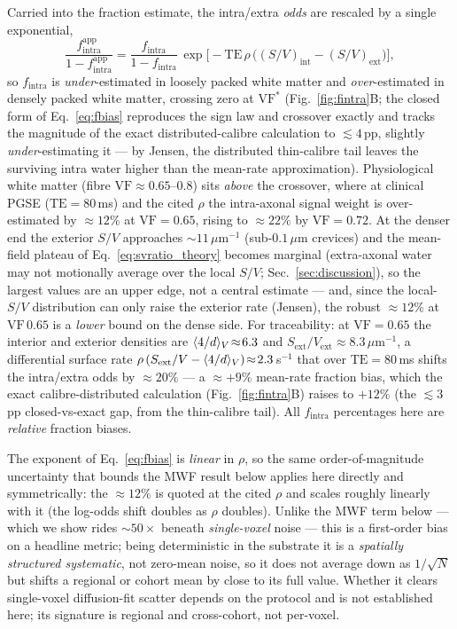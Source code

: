 Carried into the fraction estimate, the intra/extra \emph{odds} are rescaled by a single
exponential,
\begin{equation}
  \frac{f_{\mathrm{intra}}^{\mathrm{app}}}{1-f_{\mathrm{intra}}^{\mathrm{app}}}
  = \frac{f_{\mathrm{intra}}}{1-f_{\mathrm{intra}}}\,
    \exp\!\big[-\mathrm{TE}\,\rho\,\big((S/V)_{\mathrm{int}}-(S/V)_{\mathrm{ext}}\big)\big],
  \label{eq:fbias}
\end{equation}
so $f_{\mathrm{intra}}$ is \emph{under}-estimated in loosely packed white matter and
\emph{over}-estimated in densely packed white matter, crossing zero at $\mathrm{VF}^{\ast}$
(Fig.~\ref{fig:fintra}B; the closed form of Eq.~\eqref{eq:fbias} reproduces the sign law and
crossover exactly and tracks the magnitude of the exact distributed-calibre calculation to
${\lesssim}4$\,pp, slightly \emph{under}-estimating it --- by Jensen, the distributed thin-calibre
tail leaves the surviving intra water higher than the mean-rate approximation). Physiological
white matter (fibre
$\mathrm{VF}\approx0.65$--$0.8$) sits \emph{above} the crossover, where at clinical PGSE
($\mathrm{TE}=80$\,ms) and the cited $\rho$ the intra-axonal signal weight is over-estimated by
${\approx}12\%$ at $\mathrm{VF}=0.65$, rising to ${\approx}22\%$ by $\mathrm{VF}=0.72$. At the
denser end the exterior $S/V$ approaches ${\sim}11\,\mu$m$^{-1}$ (sub-$0.1\,\mu$m crevices) and
the mean-field plateau of Eq.~\eqref{eq:svratio_theory} becomes marginal (extra-axonal water may
not motionally average over the local $S/V$; Sec.~\ref{sec:discussion}), so the largest values
are an upper edge, not a central estimate --- and, since the local-$S/V$ distribution can only
raise the exterior rate (Jensen), the robust ${\approx}12\%$ at $\mathrm{VF}\,0.65$ is a
\emph{lower} bound on the dense side. For traceability:
at $\mathrm{VF}=0.65$ the interior and exterior densities are $\langle 4/d\rangle_{V}\!\approx\!6.3$ and
$S_{\mathrm{ext}}/V_{\mathrm{ext}}\!\approx\!8.3\,\mu$m$^{-1}$, a differential surface rate
$\rho\,(S_{\mathrm{ext}}/V-\langle 4/d\rangle_{V})\!\approx\!2.3\,$s$^{-1}$ that over $\mathrm{TE}=80$\,ms shifts
the intra/extra odds by ${\approx}20\%$ --- a ${\approx}{+}9\%$ mean-rate fraction bias, which
the exact calibre-distributed calculation (Fig.~\ref{fig:fintra}B) raises to ${+}12\%$ (the
${\lesssim}3$\,pp closed-vs-exact gap, from the thin-calibre tail). All $f_{\mathrm{intra}}$
percentages here are \emph{relative} fraction biases.

The exponent of Eq.~\eqref{eq:fbias} is \emph{linear} in $\rho$, so the same order-of-magnitude
uncertainty that bounds the MWF result below applies here directly and symmetrically: the
${\approx}12\%$ is quoted at the cited $\rho$ and scales roughly linearly with it (the
log-odds shift doubles as $\rho$ doubles). Unlike the MWF term below --- which we show rides
${\sim}50\times$ beneath \emph{single-voxel} noise --- this is a first-order bias on a headline
metric; being deterministic in the substrate it is a \emph{spatially structured systematic},
not zero-mean noise, so it does not average down as $1/\sqrt{N}$ but shifts a regional or cohort
mean by close to its full value. Whether it clears single-voxel diffusion-fit scatter depends on
the protocol and is not established here; its signature is regional and cross-cohort, not
per-voxel.

